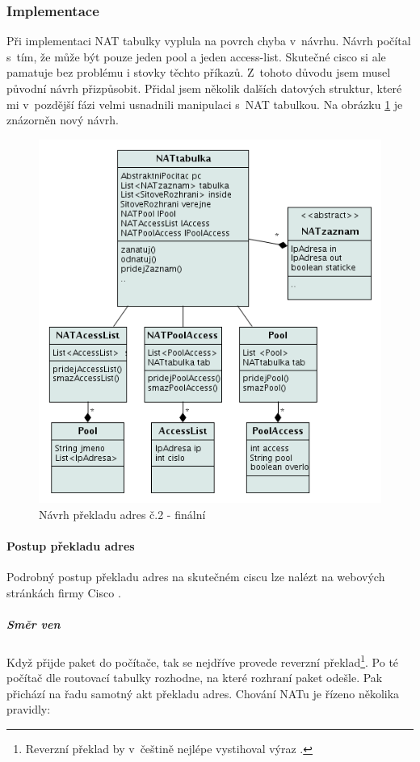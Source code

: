 \subsubsection{Implementace}
Při implementaci NAT tabulky vyplula na povrch chyba v~návrhu. Návrh počítal s~tím, že může být pouze jeden pool a jeden access-list. Skutečné cisco si ale pamatuje bez problému i stovky těchto příkazů. Z~tohoto důvodu jsem musel původní návrh přizpůsobit. Přidal jsem několik dalších datových struktur, které mi v~pozdější fázi velmi usnadnili manipulaci s~NAT tabulkou. Na obrázku \ref{fig:nat_navrh2} je znázorněn nový návrh.

\begin{figure}[b]
\begin{center}
\includegraphics[width=12cm]{figures/nat_navrh2}
\caption{Návrh překladu adres č.2 - finální}
\label{fig:nat_navrh2}
\end{center}
\end{figure}

\paragraph{Postup překladu adres}
Podrobný postup překladu adres na skutečném ciscu lze nalézt na webových stránkách firmy Cisco \cite{cisco:postup}.

\subparagraph{Směr ven}
Když přijde paket do počítače, tak se nejdříve provede reverzní překlad\footnote{Reverzní překlad by v~češtině nejlépe vystihoval výraz .}. Po té počítač dle routovací tabulky rozhodne, na které rozhraní paket odešle. Pak přichází na řadu samotný akt překladu adres. Chování NATu je řízeno několika pravidly:

